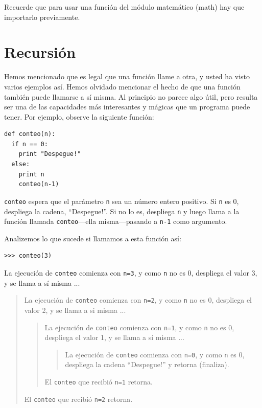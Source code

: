 Recuerde que para usar una función del módulo matemático (math)
hay que importarlo previamente.


\section{Recursión}
\label{recursion}

Hemos mencionado que es legal que una función llame a otra, y usted
 ha visto varios ejemplos así. Hemos olvidado mencionar el hecho de 
que una función también puede llamarse a sí misma. Al principio no parece
algo útil, pero resulta ser una de las capacidades más interesantes y
mágicas que un programa puede tener. Por ejemplo, observe la siguiente
función:

\beforeverb
\begin{verbatim}
def conteo(n):
  if n == 0:
    print "Despegue!"
  else:
    print n
    conteo(n-1)
\end{verbatim}
\afterverb
%
\texttt{conteo} espera que el parámetro \texttt{n} sea un número entero positivo.
Si  \texttt{n} es 0, despliega la cadena, ``Despegue!''.
Si no lo es, despliega  \texttt{n} y luego llama a la función llamada
\texttt{conteo}---ella misma---pasando a  \texttt{n-1} como argumento.

Analizemos lo que sucede si llamamos a esta función así:

\beforeverb
\begin{verbatim}
>>> conteo(3)
\end{verbatim}
\afterverb
%
La ejecución de \texttt{conteo} comienza con \texttt{n=3}, y como
\texttt{n} no es  0, despliega el valor 3, y se llama a sí misma ...

\begin{quote}
La ejecución de \texttt{conteo} comienza con \texttt{n=2}, y como
\texttt{n} no es 0, despliega el valor 2, y se llama a si misma ...

\begin{quote}
La ejecución de \texttt{conteo} comienza con \texttt{n=1}, y como
\texttt{n} no es 0, despliega el valor 1, y se llama a sí misma ...

\begin{quote}
La ejecución de \texttt{conteo} comienza con \texttt{n=0}, y como
\texttt{n} es 0, despliega la cadena ``Despegue!'' y retorna (finaliza).
\end{quote}

El  \texttt{conteo} que recibió \texttt{n=1} retorna.
\end{quote}

El  \texttt{conteo} que recibió \texttt{n=2} retorna.
\end{quote}

